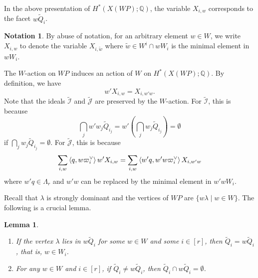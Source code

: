 \documentclass{amsart}
\newtheorem{lemma}[theorem]{Lemma}
\theoremstyle{definition}
\newtheorem{notation}[theorem]{Notation}
\theoremstyle{remark}
\numberwithin{equation}{section}
\begin{document}
In the above presentation of $H^*\left(X(\mathit{WP}) ; \mathbb{Q}\right)$, the variable $X_{i,w}$ corresponds to the facet $w \widetilde{Q}_i$.
\begin{notation} \label{nota}
    By abuse of notation, for an arbitrary element $w \in W$, we write $X_{i,w}$ to denote the variable $X_{i,\widetilde{w}}$ where $\widetilde{w} \in W^i \cap wW_i$ is the minimal element in $wW_i$.
\end{notation}

The $W$-action on $\mathit{WP}$ induces an action of $W$ on  $H^*\left(X(\mathit{WP}) ; \mathbb{Q}\right)$.
By definition, we have 
\[w' X_{i,w} = X_{i,w'w}.\]
Note that the ideals $\widetilde{\mathcal{I}}$ and $\widetilde{\mathcal{J}}$ are preserved by the $W$-action. 
For $\widetilde{\mathcal{I}}$, this is because \[\bigcap_{j} w'w_{j} \widetilde{Q}_{i_j} = w' \left(\bigcap_{j} w_{j} \widetilde{Q}_{i_j}\right) = \emptyset \] 
if $\bigcap_{j} w_{j} \widetilde{Q}_{i_j} = \emptyset$.
For $\widetilde{\mathcal{J}}$, this is because 
\[\sum_{i,w} \left\langle q, w \varpi_i\spcheck \right\rangle w'X_{i,w} = \sum_{i,w} \left\langle w'q, w'w \varpi_i\spcheck \right\rangle X_{i,w'w}\]
where $w'q \in \Lambda_r$ and $w'w$ can be replaced by the minimal element in $w'wW_i$.

Recall that $\lambda$ is strongly dominant and the vertices of $\mathit{WP}$ are $\{w \lambda \mid w \in W\}$. The following is a crucial lemma.

\begin{lemma} \label{lem-facet}
    \leavevmode
    \begin{enumerate}
      \item \label{lem-facet-1} If the vertex $\lambda$ lies in $w \widetilde{Q}_i$ for some $w \in W$ and some $i \in [r]$, then $\widetilde{Q}_i = w \widetilde{Q}_i$, that is, $w \in W_i$.
      \item \label{lem-facet-2} For any $w \in W$ and $i \in [r]$, if $\widetilde{Q}_i \ne w \widetilde{Q}_i$, then $\widetilde{Q}_i \cap w \widetilde{Q}_i = \emptyset$. 
    \end{enumerate}
\end{lemma}
\end{document}
